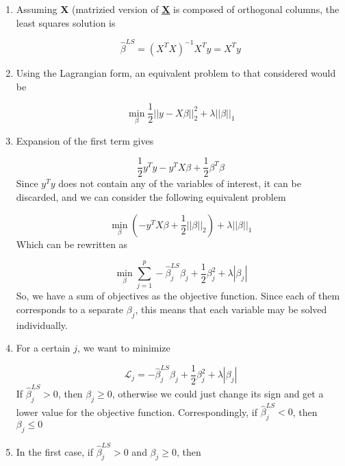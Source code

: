 \begin{enumerate}
    \item Assuming \textbf{X} (matrizied version of \textbf{\underline{X}} is composed of orthogonal columns, the least squares solution is
    
    \begin{equation}
        \hat{\beta}^{LS}=(X^TX)^{-1}X^Ty=X^Ty
    \end{equation}
    \item Using the Lagrangian form, an equivalent problem to that considered would be
    
    \begin{equation}
        \min_\beta\frac{1}{2}||y-X\beta||^2_2+\lambda||\beta||_1
    \end{equation}
    \item Expansion of the first term gives
    
    \begin{equation}
        \frac{1}{2}y^Ty-y^TX\beta+\frac{1}{2}\beta^T\beta
    \end{equation}
    Since $y^Ty$ does not contain any of the variables of interest, it can be discarded, and we can consider the following equivalent problem
    
    \begin{equation}
        \min_\beta(-y^TX\beta+\frac{1}{2}||\beta||_2)+\lambda||\beta||_1
    \end{equation}
    Which can be rewritten as
    
    \begin{equation}
        \min_\beta \sum_{j=1}^{p}-\hat{\beta}^{LS}_j\beta_j+\frac{1}{2}\beta^2_j+\lambda|\beta_j|
    \end{equation}
    So, we have a sum of objectives as the objective function. Since each of them corresponds to a separate $\beta_j$, this means that each variable may be solved individually.
    \item For a certain $j$, we want to minimize
    
    \begin{equation}
        \mathcal{L}_j = -\hat{\beta}^{LS}_j\beta_j+\frac{1}{2}\beta^2_j+\lambda|\beta_j|
    \end{equation}
    If $\hat{\beta}^{LS}_j > 0$, then $\beta_j \geq 0$, otherwise we could just change its sign and get a lower value for the objective function. Correspondingly, if $\hat{\beta}^{LS}_j < 0$, then $\beta_j \leq 0$
    \item In the first case, if $\hat{\beta}^{LS}_j > 0$ and $\beta_j \geq 0$, then
    

\end{enumerate}
